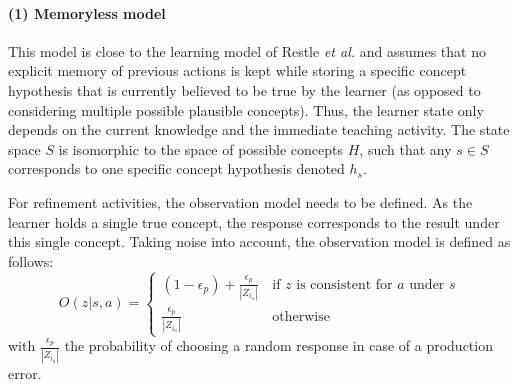 \paragraph{(1) Memoryless model}
This model is close to the learning model of Restle \textit{et al.} \cite{restle1962selection} and assumes that no explicit memory of previous actions is kept while storing a specific concept hypothesis that is currently believed to be true by the learner (as opposed to considering multiple possible plausible concepts).
Thus, the learner state only depends on the current knowledge and the immediate teaching activity.
The state space $S$ is isomorphic to the space of possible concepts $H$, such that any $s\in S$ corresponds to one specific concept hypothesis denoted $h_s$.

For refinement activities, the observation model needs to be defined.
As the learner holds a single true concept, the response corresponds to the result under this single concept.
Taking noise into account, the observation model is defined as follows:
\begin{equation}
    O(z|s,a) = \begin{cases}
        (1-\epsilon_p)+\frac{\epsilon_p}{|Z_{i_a}|}    & \, \text{if $z$ is consistent for $a$ under $s$} \\
        \frac{\epsilon_p}{|Z_{i_a}|}                   & \, \text{otherwise}
    \end{cases}
\end{equation}
with $\frac{\epsilon_p}{|Z_{i_a}|}$ the probability of choosing a random response in case of a production error.


